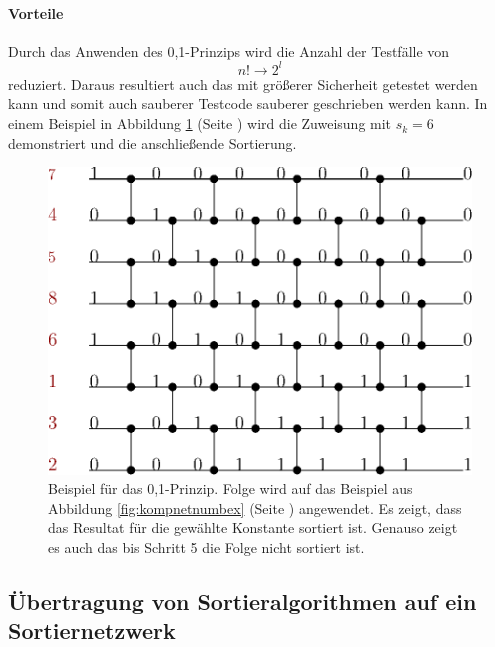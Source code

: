\documentclass[11pt]{article}
\begin{document}
\paragraph{Vorteile} Durch das Anwenden des 0,1-Prinzips wird die Anzahl der Testfälle von 
\begin{equation}
n! \rightarrow 2^l
\label{eq:fallred}
\end{equation} 
reduziert. Daraus resultiert auch das mit größerer Sicherheit getestet werden kann und somit auch sauberer Testcode sauberer geschrieben werden kann.
\FloatBarrier
In einem Beispiel in Abbildung \ref{fig:01ex} (Seite \pageref{fig:01ex}) wird die Zuweisung mit $s_k = 6$ demonstriert und die anschließende Sortierung. 
\begin{figure}
\begin{center}
\includegraphics[scale=0.75]{01beispiel.eps}
\end{center}
\caption{Beispiel für das 0,1-Prinzip. Folge wird auf das Beispiel aus Abbildung \ref{fig:kompnetnumbex} (Seite \pageref{fig:kompnetnumbex}) angewendet. Es zeigt, dass das Resultat für die gewählte Konstante sortiert ist. Genauso zeigt es auch das bis Schritt 5 die Folge nicht sortiert ist.}
\label{fig:01ex}
\end{figure}
\subsection{Übertragung von Sortieralgorithmen auf ein Sortiernetzwerk}
\end{document}
